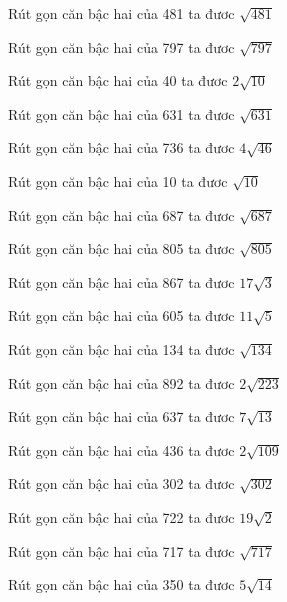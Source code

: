 \documentclass[12pt,a4paper]{article}
\begin{document}
\begin{ex}
Rút gọn căn bậc hai của 481 ta đươc $\sqrt{481}$
\end{ex}
\begin{ex}
Rút gọn căn bậc hai của 797 ta đươc $\sqrt{797}$
\end{ex}
\begin{ex}
Rút gọn căn bậc hai của 40 ta đươc $2\sqrt{10}$
\end{ex}
\begin{ex}
Rút gọn căn bậc hai của 631 ta đươc $\sqrt{631}$
\end{ex}
\begin{ex}
Rút gọn căn bậc hai của 736 ta đươc $4\sqrt{46}$
\end{ex}
\begin{ex}
Rút gọn căn bậc hai của 10 ta đươc $\sqrt{10}$
\end{ex}
\begin{ex}
Rút gọn căn bậc hai của 687 ta đươc $\sqrt{687}$
\end{ex}
\begin{ex}
Rút gọn căn bậc hai của 805 ta đươc $\sqrt{805}$
\end{ex}
\begin{ex}
Rút gọn căn bậc hai của 867 ta đươc $17\sqrt{3}$
\end{ex}
\begin{ex}
Rút gọn căn bậc hai của 605 ta đươc $11\sqrt{5}$
\end{ex}
\begin{ex}
Rút gọn căn bậc hai của 134 ta đươc $\sqrt{134}$
\end{ex}
\begin{ex}
Rút gọn căn bậc hai của 892 ta đươc $2\sqrt{223}$
\end{ex}
\begin{ex}
Rút gọn căn bậc hai của 637 ta đươc $7\sqrt{13}$
\end{ex}
\begin{ex}
Rút gọn căn bậc hai của 436 ta đươc $2\sqrt{109}$
\end{ex}
\begin{ex}
Rút gọn căn bậc hai của 302 ta đươc $\sqrt{302}$
\end{ex}
\begin{ex}
Rút gọn căn bậc hai của 722 ta đươc $19\sqrt{2}$
\end{ex}
\begin{ex}
Rút gọn căn bậc hai của 717 ta đươc $\sqrt{717}$
\end{ex}
\begin{ex}
Rút gọn căn bậc hai của 350 ta đươc $5\sqrt{14}$
\end{ex}
\end{document}
